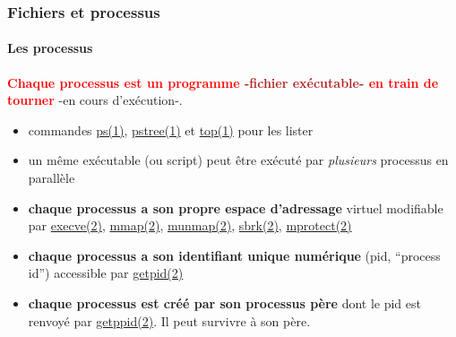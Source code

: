 \documentclass[xcolor=svgnames,final,smaller,a4]{beamer}
\begin{document}
\begin{frame}
  \frametitle{Fichiers et processus}
  \framesubtitle{Les processus}

     \textbf{\textcolor{red}{Chaque processus est un programme \textcolor{FireBrick}{-fichier exécutable-} en train de tourner}} -en cours
  d'exécution-.  {}

  \begin{relsize}{-0.5}
  \begin{itemize}

  \item commandes
    \href{https://man7.org/linux/man-pages/man1/ps.1.html}{ps(1)},
    \href{https://man7.org/linux/man-pages/man1/pstree.1.html}{pstree(1)}
    et \href{https://man7.org/linux/man-pages/man1/top.1.html}{top(1)}
    pour les lister {}
    
  \item un même exécutable (ou script) peut être exécuté par \emph{plusieurs}
    processus en parallèle {}

  \item \textbf{chaque processus a son propre espace d'adressage} virtuel modifiable par
  \href{https://man7.org/linux/man-pages/man2/execve.2.html}{execve(2)},
  \href{https://man7.org/linux/man-pages/man2/mmap.2.html}{mmap(2)},
  \href{https://man7.org/linux/man-pages/man2/munmap.2.html}{munmap(2)},
  \href{https://man7.org/linux/man-pages/man2/sbrk.2.html}{sbrk(2)},
  \href{https://man7.org/linux/man-pages/man2/mprotect.2.html}{mprotect(2)}

    \item  \textbf{chaque processus a son identifiant unique numérique} (pid, ``process id'')
 accessible par \href{https://man7.org/linux/man-pages/man2/getpid.2.html}{getpid(2)}
    
    \item \textbf{chaque processus est créé par son processus père} {} dont le pid est renvoyé par
  \href{https://man7.org/linux/man-pages/man2/getppid.2.html}{getppid(2)}. Il peut survivre à son père.
    
  \end{itemize}
  \end{relsize}
  
\end{frame}
\end{document}
